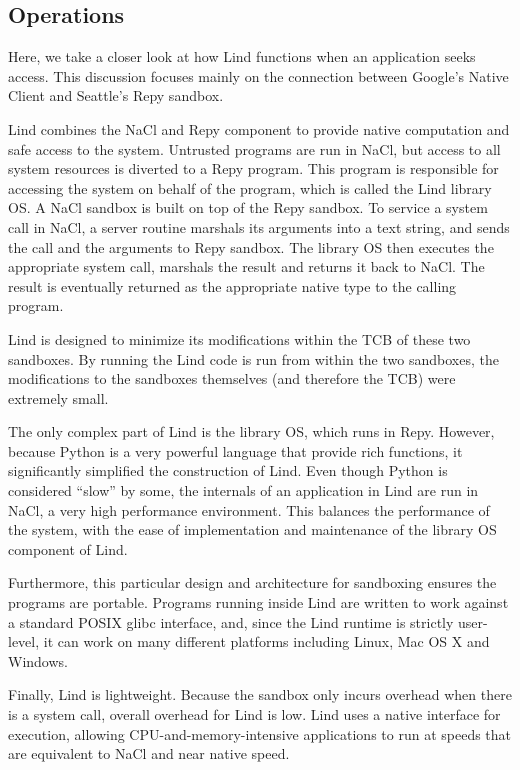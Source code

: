 \subsection{Operations}

Here, we take a closer look at how Lind functions when an application seeks access. 
This discussion focuses mainly on the connection between Google's Native Client and Seattle's Repy sandbox.

Lind combines the NaCl and Repy component to provide native computation and 
safe access to the system. Untrusted programs are run in NaCl, 
but access to all system resources is diverted to a Repy program. 
This program is responsible for accessing the system on behalf of the program, 
which is called the Lind library OS. A NaCl sandbox is built on top of the Repy sandbox. 
To service a system call in NaCl, a server routine marshals its arguments into a text string, 
and sends the call and the arguments to Repy sandbox. 
The library OS then executes the appropriate system call, marshals the result and 
returns it back to NaCl. The result is eventually returned as the appropriate native type to the calling program. 

Lind is designed to minimize its modifications within the TCB of these two sandboxes. 
By running the Lind code is run from within the two sandboxes, 
the modifications to the sandboxes themselves (and therefore the TCB) were extremely small. 

The only complex part of Lind is the library OS, which runs in Repy. 
However, because Python is a very powerful language that provide rich functions, 
it significantly simplified the construction of Lind. Even though Python is considered ``slow'' by some, 
the internals of an application in Lind are run in NaCl, a very high performance environment. 
This balances the performance of the system, with the ease of implementation and maintenance 
of the library OS component of Lind. 

Furthermore, this particular design and architecture for sandboxing ensures the programs are portable. 
Programs running inside Lind are written to work against a standard POSIX glibc interface, 
and, since the Lind runtime is strictly user-level, it can work on many different platforms 
including Linux, Mac OS X and Windows.

Finally, Lind is lightweight. Because the sandbox only incurs overhead when there is a system call, 
overall overhead for Lind is low. Lind uses a native interface for execution, 
allowing CPU-and-memory-intensive applications to run at speeds that are equivalent to NaCl and near native speed. 

